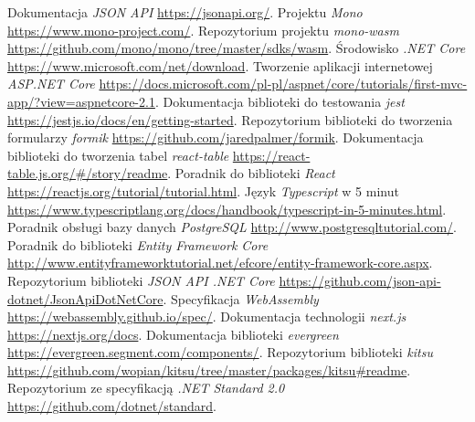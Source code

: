\documentclass[a4paper,11pt,twoside]{report}
\theoremstyle{definition}
\begin{document}


\begin{thebibliography}{35}%
     Dokumentacja \emph{JSON API} \url{https://jsonapi.org/}.
     Projektu \emph{Mono} \url{https://www.mono-project.com/}.
     Repozytorium projektu \emph{mono-wasm} \url{https://github.com/mono/mono/tree/master/sdks/wasm}.
     Środowisko \emph{.NET Core} \url{https://www.microsoft.com/net/download}.
     Tworzenie aplikacji internetowej \emph{ASP.NET Core} \url{https://docs.microsoft.com/pl-pl/aspnet/core/tutorials/first-mvc-app/?view=aspnetcore-2.1}.
     Dokumentacja biblioteki do testowania \emph{jest} \url{https://jestjs.io/docs/en/getting-started}.
     Repozytorium biblioteki do tworzenia formularzy \emph{formik} \url{https://github.com/jaredpalmer/formik}.
     Dokumentacja biblioteki do tworzenia tabel \emph{react-table} \url{https://react-table.js.org/#/story/readme}.
     Poradnik do biblioteki \emph{React} \url{https://reactjs.org/tutorial/tutorial.html}.
     Język \emph{Typescript} w 5 minut \url{https://www.typescriptlang.org/docs/handbook/typescript-in-5-minutes.html}.
     Poradnik obsługi bazy danych \emph{PostgreSQL} \url{http://www.postgresqltutorial.com/}.
     Poradnik do biblioteki \emph{Entity Framework Core} \url{http://www.entityframeworktutorial.net/efcore/entity-framework-core.aspx}.
     Repozytorium biblioteki \emph{JSON API .NET Core} \url{https://github.com/json-api-dotnet/JsonApiDotNetCore}.
     Specyfikacja \emph{WebAssembly} \url{https://webassembly.github.io/spec/}.
     Dokumentacja technologii \emph{next.js} \url{https://nextjs.org/docs}.
     Dokumentacja biblioteki \emph{evergreen} \url{https://evergreen.segment.com/components/}.
     Repozytorium biblioteki \emph{kitsu} \url{https://github.com/wopian/kitsu/tree/master/packages/kitsu#readme}.
     Repozytorium ze specyfikacją \emph{.NET Standard 2.0} \url{https://github.com/dotnet/standard}.

\end{thebibliography}
\end{document}
